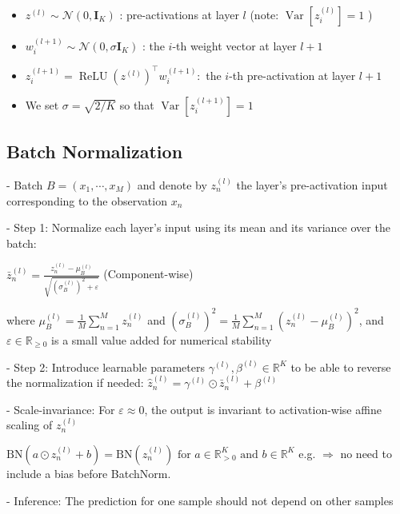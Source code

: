 \begin{itemize}
  \item $z^{(l)} \sim \mathcal{N}\left(0, \mathbf{I}_{K}\right)$ : pre-activations at layer $l$ (note: $\operatorname{Var}\left[z_{i}^{(l)}\right]=1$ )

  \item $w_{i}^{(l+1)} \sim \mathcal{N}\left(0, \sigma \mathbf{I}_{K}\right)$ : the $i$-th weight vector at layer $l+1$

  \item $z_{i}^{(l+1)}=\operatorname{ReLU}\left(z^{(l)}\right)^{\top} w_{i}^{(l+1)}:$ the $i$-th pre-activation at layer $l+1$
  \item We set $\sigma=\sqrt{2 / K}$ so that $\operatorname{Var}\left[z_{i}^{(l+1)}\right]=1$

\end{itemize}


\subsection*{Batch Normalization}
- Batch $B=\left(x_{1}, \cdots, x_{M}\right)$ and denote by $z_{n}^{(l)}$ the layer's pre-activation input corresponding to the observation $x_{n}$

- Step 1: Normalize each layer's input using its mean and its variance over the batch:

$
\bar{z}_{n}^{(l)}=\frac{z_{n}^{(l)}-\mu_{B}^{(l)}}{\sqrt{\left(\sigma_{B}^{(l)}\right)^{2}+\varepsilon}}
$ (Component-wise)

where $\mu_{B}^{(l)}=\frac{1}{M} \sum_{n=1}^{M} z_{n}^{(l)}$ and $\left(\sigma_{B}^{(l)}\right)^{2}=\frac{1}{M} \sum_{n=1}^{M}\left(z_{n}^{(l)}-\mu_{B}^{(l)}\right)^{2}$, and $\varepsilon \in \mathbb{R}_{\geq 0}$ is a small value added for numerical stability

- Step 2: Introduce learnable parameters $\gamma^{(l)}, \beta^{(l)} \in \mathbb{R}^{K}$ to be able to reverse the normalization if needed:
$
\hat{z}_{n}^{(l)}=\gamma^{(l)} \odot \bar{z}_{n}^{(l)}+\beta^{(l)}
$

- Scale-invariance: For $\varepsilon \approx 0$, the output is invariant to activation-wise affine scaling of $z_{n}^{(l)}$

$
\mathrm{BN}\left(a \odot z_{n}^{(l)}+b\right)=\mathrm{BN}\left(z_{n}^{(l)}\right) \text { for } a \in \mathbb{R}_{>0}^{K} \text { and } b \in \mathbb{R}^{K}
$ e.g. $\Rightarrow$ no need to include a bias before BatchNorm.

- Inference: The prediction for one sample should not depend on other samples

